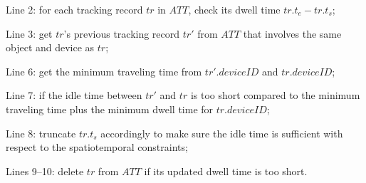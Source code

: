 \begin{frame}
\begin{columns}[c]
  \begin{sitemize}
    \item Line 2: for each tracking record $tr$ in $ATT$, check its dwell time $tr.t_e - tr.t_s$;
    \item Line 3: get $tr$'s previous tracking record $tr'$ from $ATT$ that involves the same object and device as $tr$;
    \item Line 6: get the minimum traveling time from $tr'.deviceID$ and $tr.deviceID$;
    \item Line 7: if the idle time between $tr'$ and $tr$ is too short compared to the minimum traveling time plus the minimum dwell time for $tr.deviceID$;
    \item Line 8: truncate $tr.t_s$ accordingly to make sure the idle time is sufficient with respect to the spatiotemporal constraints;
    \item Lines 9--10: delete $tr$ from $ATT$ if its updated dwell time is too short.
  \end{sitemize}

\end{columns}

\end{frame}


